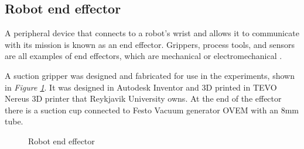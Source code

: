 
\subsection{Robot end effector\label{subsec:robotend}}
A peripheral device that connects to a robot's wrist and allows it to communicate with its mission is known as an end effector. Grippers, process tools, and sensors are all examples of end effectors, which are mechanical or electromechanical \cite{wilson_relative_1996}. 

A suction gripper was designed and fabricated for use in the experiments, shown in \textit{Figure \ref{figure: endeffector}}.
It was designed in Autodesk Inventor \cite{noauthor_professional-grade_nodate} and 3D printed in TEVO Nereus 3D printer that Reykjavik University owns. At the end of the effector there is a suction cup connected to Festo Vacuum generator OVEM with an 8mm tube.
\begin{figure}[ht]
    \centering
    \hfill
    \hfill
    \caption{Robot end effector}
    \label{figure: endeffector}
\end{figure}

